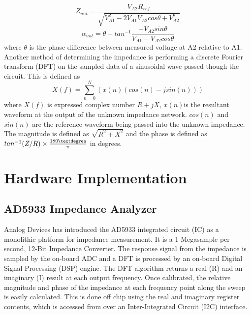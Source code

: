 \documentclass[]{IEEEtran}
\begin{document}
\[Z_{uut}=\frac{V_{A2}R_{ref}}{\sqrt{V^2_{A1}-2V_{A1}V_{A2}cos\theta+V^2_{A2}}}\]
\newline
\[\alpha_{uut}=\theta-tan^{-1}\frac{-V_{A2}sin\theta}{V_{A1}-V_{A2}cos\theta} \]
where \(\theta\) is the phase difference between measured voltage at A2 relative to A1.
\newline
Another method of determining the impedance is performing a discrete Fourier transform (DFT) on the sampled data of a sinusoidal wave passed though the circuit. This is defined as
\[X(f)=\sum_{n=0}^{N}(x(n)(cos(n)-jsin(n)))\]
where \(X(f)\) is expressed complex number \(R+jX\), \(x(n)\)is the resultant waveform at the output of the unknown impedance network. \(cos(n)\) and \(sin(n)\) are the reference waveform being passed into the unknown impedance. The magnitude is defined as \(\sqrt{R^2+X^2}\) and the phase is defined as \(tan^{-1}(Z/R)\times\frac{180\textdegree}{\pi}\) in degrees\cite{noauthor_ad5933_nodate}.

\section{Hardware Implementation}

\subsection{AD5933 Impedance Analyzer}
Analog Devices has introduced the AD5933 integrated circuit (IC) as a monolithic platform for impedance measurement. It is a 1 Megasample per second, 12-Bit Impedance Converter\cite{noauthor_ad5933_nodate}. The response signal from the impedance is sampled by the on-board ADC and a DFT is processed by an on-board Digital Signal Processing (DSP) engine. The DFT algorithm returns a real (R) and an imaginary (I) result at each output frequency. Once calibrated, the relative magnitude and phase of the impedance at each frequency point along the sweep is easily calculated. This is done off chip using the real and imaginary register contents, which is accessed from over an Inter-Integrated Circuit (I2C) interface.\newline
\end{document}
